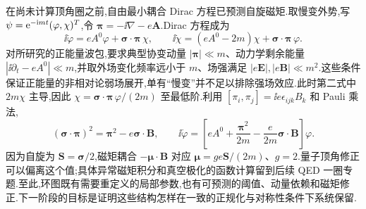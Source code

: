 在尚未计算顶角圈之前,自由最小耦合 Dirac 方程已预测自旋磁矩.取慢变外势,写 $\psi=\mathrm e^{-\mathrm i mt}(\varphi,\chi)^T$,令 $\boldsymbol\pi=-\ii\nabla-e\mathbf A$.Dirac 方程成为
\begin{equation}
 \ii\dot\varphi=eA^0\varphi+\boldsymbol\sigma\cdot\boldsymbol\pi\,\chi,
 \qquad
 \ii\dot\chi=(eA^0-2m)\chi+\boldsymbol\sigma\cdot\boldsymbol\pi\,\varphi.
\end{equation}
对所研究的正能量波包,要求典型协变动量 $|\boldsymbol\pi|\ll m$、动力学剩余能量 $|\ii\partial_t-eA^0|\ll m$,并取外场变化频率远小于 $m$、场强满足 $|e\mathbf E|,|e\mathbf B|\ll m^2$.这些条件保证正能量的非相对论弱场展开,单有“慢变”并不足以排除强场效应.此时第二式中 $2m\chi$ 主导,因此 $\chi=\boldsymbol\sigma\cdot\boldsymbol\pi\,\varphi/(2m)$ 至最低阶.利用 $[\pi_i,\pi_j]=\ii e\epsilon_{ijk}B_k$ 和 Pauli 乘法,
\begin{equation}
 (\boldsymbol\sigma\cdot\boldsymbol\pi)^2
 =\boldsymbol\pi^2-e\boldsymbol\sigma\cdot\mathbf B,
 \qquad
 \ii\dot\varphi=
 \left[eA^0+\frac{\boldsymbol\pi^2}{2m}
 -\frac e{2m}\boldsymbol\sigma\cdot\mathbf B\right]\varphi.
\end{equation}
因为自旋为 $\mathbf S=\boldsymbol\sigma/2$,磁矩耦合 $-\boldsymbol\mu\cdot\mathbf B$ 对应 $\boldsymbol\mu=g e\mathbf S/(2m)$、$g=2$.量子顶角修正可以偏离这个值;具体异常磁矩积分和真空极化的函数计算留到后续 QED 一圈专题.至此,环图既有需要重定义的局部参数,也有可预测的阈值、动量依赖和磁矩修正.下一阶段的目标是证明这些结构怎样在一致的正规化与对称性条件下系统保留.
